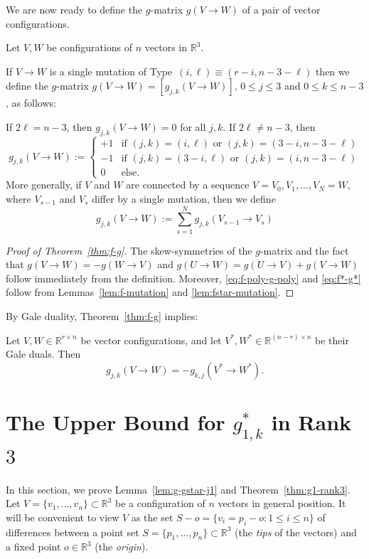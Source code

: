 \documentclass[a4paper,USenglish,cleveref, autoref, thm-restate,nolineno]{socg-lipics-v2021}
\renewcommand{\leq}{\leqslant}
\newcommand{\R}{\mathbb{R}}
\begin{document}
We are now ready to define the $g$-matrix $g(V\rightarrow W)$ of a pair of vector configurations. 
\begin{definition}
\label{def:g-pair}
Let $V,W$ be configurations of $n$ vectors in $\R^3$. 

If $V\to W$ is a single mutation of Type~$(i,\ell)\equiv(r-i,n-3-\ell)$ then we define the $g$-matrix 
$g(V\rightarrow W)=[g_{j,k}(V\rightarrow W)]$, $0\leq j\leq 3$ and $0\leq k \leq n-3$, as follows: 

If 
$2\ell=n-3$, then $g_{j,k}(V\to W)=0$ for all $j,k$. If 
$2\ell\neq n-3$, then
\[
g_{j,k}(V\to W):= 
\begin{cases}
  +1 & \textrm{if } (j,k)=(i,\ell) \textrm{ or }(j,k)=(3-i,n-3-\ell)\\
  -1 & \textrm{if } (j,k)=(3-i,\ell) \textrm{ or }(j,k)=(i,n-3-\ell)\\
  0 & \textrm{else.}  
\end{cases}
\]
More generally, if $V$ and $W$ are connected by a sequence $V=V_0, V_1,\dots, V_N=W$, where $V_{s-1}$ and $V_s$ differ by a single mutation, then we define
\[
g_{j,k}(V\to W):= \sum_{s=1}^N g_{j,k}(V_{s-1}\to V_s)
\]
\end{definition}

\begin{proof}[Proof of Theorem~\ref{thm:f-g}]
The skew-symmetries of the $g$-matrix and the fact that $g(V\to W)=-g(W\to V)$ and $g(U\to W)=g(U\to V)+g(V\to W)$ follow immediately from the definition. Moreover, \eqref{eq:f-poly-g-poly} and \eqref{eq:f*-g*} follow from Lemmas~\ref {lem:f-mutation} and \ref{lem:fstar-mutation}.
\end{proof}

By Gale duality, Theorem~\ref{thm:f-g} implies:
\begin{corollary} Let $V,W\in \R^{r\times n}$ be vector configurations, and let $V^*,W^*\in  \R^{(n-r)\times n}$ be their Gale duals. Then
\label{cor:g-pair-dual}
\[ g_{j,k}(V \to W) = -g_{k,j}(V^* \to W^*).\]
\end{corollary}

\section{The Upper Bound for $g_{1,k}^*$ in Rank $3$}
\label{sec:g1-arcs}
In this section, we prove Lemma~\ref{lem:g-gstar-j1}  and Theorem~\ref{thm:g1-rank3}.
Let $V=\{v_1,\dots,v_n\}\subset \R^3$ be a configuration of $n$ vectors in general position.  It will be convenient to view $V$ as the set $S-o=\{v_i=p_i-o\colon 1\leq i\leq n\}$ of differences between a point set $S=\{p_1,\dots,p_n\} \subset \R^3$ (the \emph{tips} of the vectors) and a fixed point $o\in \R^3$ (the \emph{origin}). 
\end{document}
